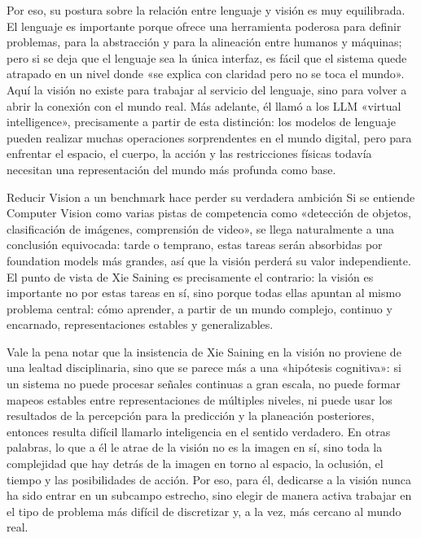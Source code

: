 Por eso, su postura sobre la relación entre lenguaje y visión es muy equilibrada. El lenguaje es importante porque ofrece una herramienta poderosa para definir problemas, para la abstracción y para la alineación entre humanos y máquinas; pero si se deja que el lenguaje sea la única interfaz, es fácil que el sistema quede atrapado en un nivel donde «se explica con claridad pero no se toca el mundo». Aquí la visión no existe para trabajar al servicio del lenguaje, sino para volver a abrir la conexión con el mundo real. Más adelante, él llamó a los LLM «virtual intelligence», precisamente a partir de esta distinción: los modelos de lenguaje pueden realizar muchas operaciones sorprendentes en el mundo digital, pero para enfrentar el espacio, el cuerpo, la acción y las restricciones físicas todavía necesitan una representación del mundo más profunda como base.

\begin{warningbox}{Reducir Vision a un benchmark hace perder su verdadera ambición}
Si se entiende Computer Vision como varias pistas de competencia como «detección de objetos, clasificación de imágenes, comprensión de video», se llega naturalmente a una conclusión equivocada: tarde o temprano, estas tareas serán absorbidas por foundation models más grandes, así que la visión perderá su valor independiente. El punto de vista de Xie Saining es precisamente el contrario: la visión es importante no por estas tareas en sí, sino porque todas ellas apuntan al mismo problema central: cómo aprender, a partir de un mundo complejo, continuo y encarnado, representaciones estables y generalizables.
\end{warningbox}

Vale la pena notar que la insistencia de Xie Saining en la visión no proviene de una lealtad disciplinaria, sino que se parece más a una «hipótesis cognitiva»: si un sistema no puede procesar señales continuas a gran escala, no puede formar mapeos estables entre representaciones de múltiples niveles, ni puede usar los resultados de la percepción para la predicción y la planeación posteriores, entonces resulta difícil llamarlo inteligencia en el sentido verdadero. En otras palabras, lo que a él le atrae de la visión no es la imagen en sí, sino toda la complejidad que hay detrás de la imagen en torno al espacio, la oclusión, el tiempo y las posibilidades de acción. Por eso, para él, dedicarse a la visión nunca ha sido entrar en un subcampo estrecho, sino elegir de manera activa trabajar en el tipo de problema más difícil de discretizar y, a la vez, más cercano al mundo real.

